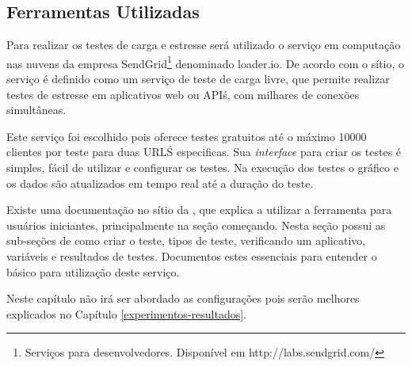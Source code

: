 





\subsection{Ferramentas Utilizadas}
\label{ferramentas-utilizadas-para-testes}
  
  Para realizar os testes de carga e estresse será utilizado o serviço em computação nas nuvens
  da empresa SendGrid\footnote{Serviços para desenvolvedores. Disponível em http://labs.sendgrid.com/} denominado loader.io.
  De acordo com o sítio, o serviço é definido como um serviço de teste de carga livre,
  que permite realizar testes de estresse em aplicativos web ou API\'s, com milhares de conexões simultâneas.
  
  Este serviço foi escolhido pois oferece testes gratuitos até o máximo 10000 clientes por teste para duas 
  URL\'S especificas. Sua \textit{interface} para criar os testes é simples, fácil de utilizar e
  configurar os testes. Na execução dos testes o gráfico e os dados são atualizados em tempo real até a duração do teste.
  
  Existe uma documentação no sítio da , que explica a utilizar a ferramenta para usuários
  iniciantes, principalmente na seção começando. Nesta seção possui as sub-seções de como criar o teste, tipos de teste,
  verificando um aplicativo, variáveis e resultados de testes. Documentos estes essenciais para 
  entender o básico para utilização deste serviço. 
  
  Neste capítulo não irá ser abordado as configurações pois serão melhores explicados
  no Capítulo \ref{experimentos-resultados}.